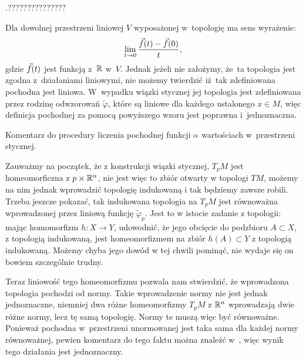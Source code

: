 \documentclass[a4paper,11pt]{article}
\begin{document}
\vspace{\spaceFour}





\noindent
{} .???????????????

\vspace{\spaceFour}





\noindent
{} Dla dowolnej przestrzeni liniowej $V$ wyposażonej w~topologię
ma sens wyrażenie:
\begin{equation}
  \label{eq:GancarzewiczZWGR-s01-02}
  \lim\limits_{ t \to 0 } \frac{ \vec{ f }( t ) - \vec{ f }( 0 ) }{ t },
\end{equation}
gdzie $\vec{ f }( t )$ jest funkcją z~$\mathbb{R}$ w~$V$. Jednak jeżeli
nie założymy, że~ta topologia jest zgodna z~działaniami liniowymi, nie
możemy twierdzić iż~tak zdefiniowana pochodna jest liniowa. W~wypadku
wiązki stycznej jej topologia jest zdefiniowana przez rodzinę
odwzorowań $\widetilde{ \varphi }$, które są liniowe dla każdego
ustalonego $x \in M$, więc definicja pochodnej za pomocą powyższego
wzoru jest poprawna i~jednoznaczna.

\vspace{\spaceFour}





\noindent
Komentarz do procedury liczenia pochodnej funkcji o~wartościach
w~przestrzeni stycznej.

Zauważmy na początek, że z konstrukcji wiązki stycznej, $T_{ p }M$
jest homeomorficzna z $p \times \mathbb{R}^{ n }$, nie jest więc to
zbiór otwarty w topologi $TM$, możemy na nim jednak wprowadzić
topologię indukowaną i tak będziemy zawsze robili. Trzeba jeszcze
pokazać, tak indukowana topologia na $T_{ p }M$ jest równoważna
wprowadzonej przez liniową funkcję $\widetilde{ \varphi }_{ p }$. Jest
to w istocie zadanie z topologii: mając homomorfizm $h : X \to Y$,
udowodnić, że jego obcięcie do podzbioru $A \subset X$, z topologią indukowaną,
jest homeomorfizmem na zbiór $h( A ) \subset Y$ z topologią indukowaną. Możemy
chyba jego dowód w tej chwili pominąć, nie wydaje się on bowiem
szczególnie trudny.

Teraz liniowość tego homeomorfizmu pozwala nam stwierdzić, że
wprowadzona topologia pochodzi od normy. Takie wprowadzenie normy nie
jest jednak jednoznaczne, niemniej dwa różne homeomorfizmy $T_{ p }M$
z $\mathbb{R}^{ n }$ wprowadzają dwie różne normy, lecz tę samą
topologię. Normy te muszą więc być równoważne. Ponieważ pochodna w~przestrzeni unormowanej jest taka sama dla każdej normy równoważnej,
pewien komentarz do tego faktu można znaleźć
w~\cite{SchwartzKursAnalizyMatematycznejVolI1979}, więc
wynik tego działania jest jednoznaczny.
\end{document}
